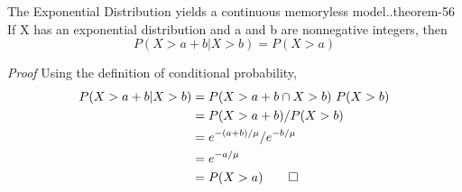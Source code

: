 \documentclass[10pt,]{book}
\makeatletter
\renewcommand*{\proofname}{Proof}
\renewenvironment{proof}[1][\proofname]{\par
  \pushQED{\qed}%
  \normalfont \topsep6\p@\@plus6\p@\relax
  \trivlist
  \item\relax
    {\itshape
    #1\@addpunct{.}}\hspace\labelsep\ignorespaces
}{%
  \popQED\endtrivlist\@endpefalse
}
\numberwithin{equation}{section}
\makeatother
\begin{document}
%
\par
\hypertarget{p-1103}{}%
\begin{theorem}{The Exponential Distribution yields a continuous memoryless model..}{}{theorem-56}%
\hypertarget{p-1104}{}%
If X has an exponential distribution and a and b are nonnegative integers, then%
\begin{equation*}
P( X > a + b | X > b ) = P( X > a)
\end{equation*}
%
\end{theorem}
\begin{proof}\hypertarget{proof-59}{}
\hypertarget{p-1105}{}%
Using the definition of conditional probability,%
\begin{align*}
P( X > a + b | X > b ) & = P( X > a + b \cap X > b ) \ P( X > b)\\
& = P( X > a + b ) / P( X > b)\\
& = e^{-(a+b)/ \mu} / e^{-b / \mu}\\
& = e^{-a/ \mu}\\
& = P(X > a)\qedhere
\end{align*}
%
\end{proof}
%
\par
\hypertarget{p-1106}{}%
\end{document}
